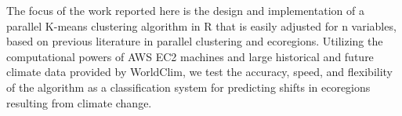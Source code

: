 \documentclass[a4paper,10pt]{article}
\begin{document}
The focus of the work reported here is the design and implementation of a parallel K-means clustering algorithm in R that is easily adjusted for n variables, based on previous literature in parallel clustering and ecoregions. Utilizing the computational powers of AWS EC2 machines and large historical and future climate data provided by WorldClim, we test the accuracy, speed, and flexibility of the algorithm as a classification system for predicting shifts in ecoregions resulting from climate change.




\end{document}
